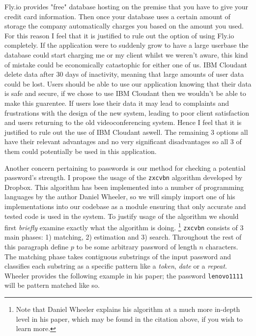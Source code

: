 Fly.io provides "free" database hosting on the premise that
you have to give your credit card information. Then once 
your database uses a certain amount of storage the company
automatically charges you based on the amount you used. For
this reason I feel that it is justified to rule out the
option of using Fly.io completely. If the application were
to suddenly grow to have a large userbase the database could
start charging me or my client whilst we weren't aware, this
kind of mistake could be economically catastophic for either 
one of us. IBM Cloudant delete data after 30 days of 
inactivity, meaning that large amounts of user data could 
be lost. Users should be able to use our application knowing
that their data is safe and secure, if we chose to use IBM
Cloudant then we wouldn't be able to make this guarentee. If
users lose their data it may lead to complaints and 
frustrations with the design of the new system, leading to 
poor client satisfaction and users returning to the old 
videoconferencing system. Hence I feel that it is justified 
to rule out the use of IBM Cloudant aswell. The remaining 3 
options all have their relevant advantages and no very
significant disadvantages so all 3 of them could potentially
be used in this application.

\vspace{0.2cm}

Another concern pertaining to passwords is our method for 
checking a potential password's strength. I propose the usage
of the \texttt{zxcvbn} algorithm \cite{pass} developed by
Dropbox. This algorithm has been implemented into a number of
programming languages by the author Daniel Wheeler, so we will
simply import one of his implementations into our codebase as
a module ensuring that only accurate and tested code is used 
in the system. To justify usage of the algorithm we should
first \textit{briefly} examine exactly what the algorithm is
doing. \footnote{Note that Daniel Wheeler explains his
algorithm at a much more in-depth level in his paper, which
may be found in the citation above, if you wish to learn
more.} \texttt{zxcvbn} consists of 3 main phases: 1) matching,
2) estimation and 3) search. Throughout the rest of this
paragraph define $p$ to be some arbitrary password of length
$n$ characters. The matching phase takes contiguous
substrings of the input password and classifies
each substring as a specific pattern like a \textit{token},
\textit{date} or a \textit{repeat}. Wheeler provides the
following example in his paper; the password
\texttt{lenovo1111} will be pattern matched like so.

